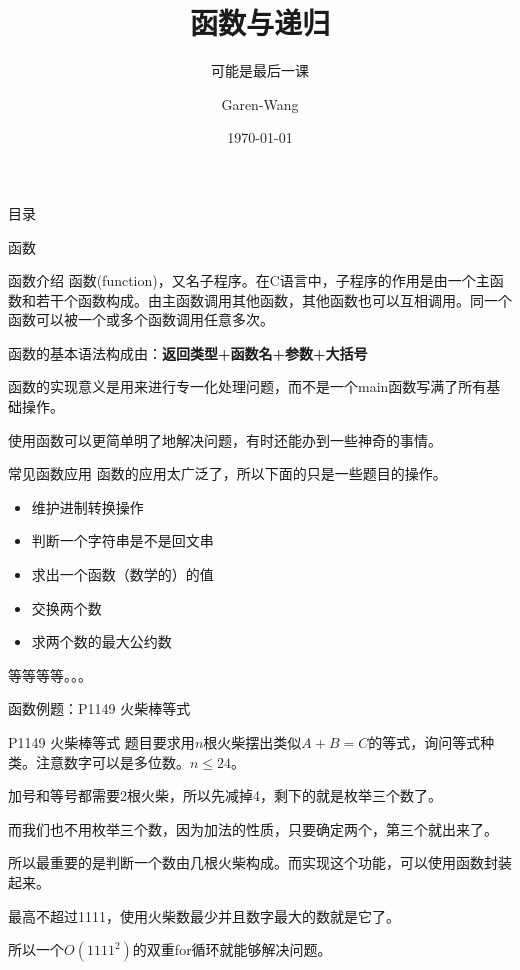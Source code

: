 \documentclass[UTF-8]{beamer}
\begin{document}
\title{函数与递归}
\subtitle{可能是最后一课}
\author{Garen-Wang}
\date{\today}

\titlepage
\begin{frame}{目录}
\tableofcontents
\end{frame}

\begin{section}{函数}
\begin{frame}{函数介绍}
\pause
函数(function)，又名子程序。在C语言中，子程序的作用是由一个主函数和若干个函数构成。由主函数调用其他函数，其他函数也可以互相调用。同一个函数可以被一个或多个函数调用任意多次。\pause

函数的基本语法构成由：\textbf{返回类型+函数名+参数+大括号}\pause

函数的实现意义是用来进行专一化处理问题，而不是一个main函数写满了所有基础操作。\pause

使用函数可以更简单明了地解决问题，有时还能办到一些神奇的事情。
\end{frame}
\begin{frame}{常见函数应用}
\pause
函数的应用太广泛了，所以下面的只是一些题目的操作。\pause

\begin{itemize}
  \item 维护进制转换操作
  \item 判断一个字符串是不是回文串
  \item 求出一个函数（数学的）的值
  \item 交换两个数
  \item 求两个数的最大公约数
\end{itemize}
\pause
等等等等。。。
\end{frame}
\end{section}

\begin{section}{函数例题：P1149 火柴棒等式}
\begin{frame}{P1149 火柴棒等式}
\pause
题目要求用$n$根火柴摆出类似$A+B=C$的等式，询问等式种类。注意数字可以是多位数。$n \leq 24$。\pause

加号和等号都需要2根火柴，所以先减掉4，剩下的就是枚举三个数了。\pause

而我们也不用枚举三个数，因为加法的性质，只要确定两个，第三个就出来了。\pause

所以最重要的是判断一个数由几根火柴构成。而实现这个功能，可以使用函数封装起来。\pause

最高不超过1111，使用火柴数最少并且数字最大的数就是它了。\pause

所以一个$O(1111^2)$的双重for循环就能够解决问题。
\end{frame}
\end{section}
\end{document}
